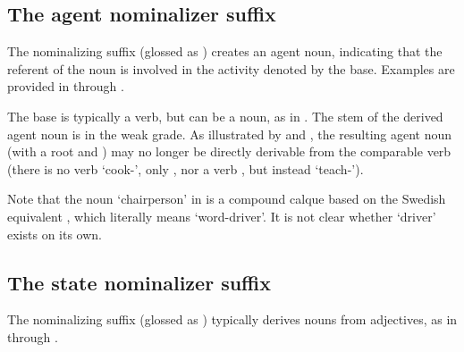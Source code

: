 \subsection{The agent nominalizer suffix }\label{agentNMLZ}
The nominalizing suffix  (glossed as ) creates an agent noun, indicating that the referent of the noun is involved in the activity denoted by the base. Examples are provided in  through . 
\ea\label{agentNMLZex1}
\z
\ea\label{agentNMLZex2}
\z
\ea\label{agentNMLZex3}
\z
\ea\label{agentNMLZex4}
\z
\ea\label{agentNMLZex5}
\z

The base is typically a verb, but can be a noun, as in . The stem of the derived agent noun is in the weak grade. 
As illustrated by  and , the resulting agent noun (with a root  and ) may no longer be directly derivable from the comparable verb (there is no verb  ‘cook-’, only , nor a verb , but instead  ‘teach-’). 

Note that the noun  ‘chairperson’ in  is a compound calque based on the Swedish equivalent , which literally means ‘word-driver’. It is not clear whether \QUES{} ‘driver’ exists on its own. 




\subsection{The state nominalizer suffix }\label{vuohta}
The nominalizing suffix  (glossed as ) typically derives nouns from adjectives, 
as in  through . 
\ea\label{vuohtaEx1}
\z
\ea\label{vuohtaEx2}
\z
\ea\label{vuohtaEx3}
\z

